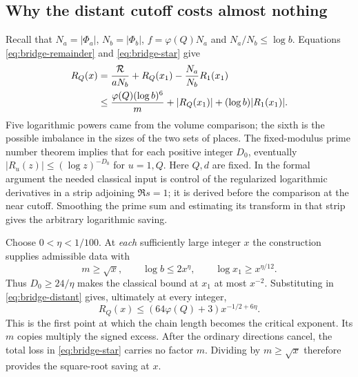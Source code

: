 \subsection{Why the distant cutoff costs almost nothing}

Recall that \(N_a=|\Phi_a|\), \(N_b=|\Phi_b|\), \(f=\varphi(Q)N_a\) and \(N_a/N_b\le\log b\). Equations \eqref{eq:bridge-remainder} and \eqref{eq:bridge-star} give
\begin{align}
 R_Q(x)
  &=\frac{\mathcal R}{aN_b}+R_Q(x_1)-\frac{N_a}{N_b} R_1(x_1)\notag\\
  &\le\frac{\varphi(Q)(\log b)^6}{m}
                      +|R_Q(x_1)|+(\log b)|R_1(x_1)|.\label{eq:bridge-distant}
\end{align}
Five logarithmic powers came from the volume comparison; the sixth is the possible imbalance in the sizes of the two sets of places. The fixed-modulus prime number theorem implies that for each positive integer \(D_0\), eventually \(|R_u(z)|\le (\log z)^{-D_0}\) for \(u=1,Q\). Here \(Q,d\) are fixed. In the formal argument the needed classical input is control of the regularized logarithmic derivatives in a strip adjoining \(\Re s=1\); it is derived before the comparison at the near cutoff. Smoothing the prime sum and estimating its transform in that strip gives the arbitrary logarithmic saving.

Choose \(0<\eta<1/100\). At \emph{each} sufficiently large integer \(x\) the construction supplies admissible data with
\[
           m\ge\sqrt{x},\qquad \log b\le2x^\eta,\qquad
           \log x_1\ge x^{\eta/12}.
\]
Thus \(D_0\ge24/\eta\) makes the classical bound at \(x_1\) at most \(x^{-2}\). Substituting in \eqref{eq:bridge-distant} gives, ultimately at every integer,
\begin{equation}\label{eq:bridge-integer}
              R_Q(x)\le(64\varphi(Q)+3)x^{-1/2+6\eta}.
\end{equation}
This is the first point at which the chain length becomes the critical exponent. Its \(m\) copies multiply the signed excess. After the ordinary directions cancel, the total loss in \eqref{eq:bridge-star} carries no factor \(m\). Dividing by \(m\ge\sqrt x\) therefore provides the square-root saving at \(x\).

